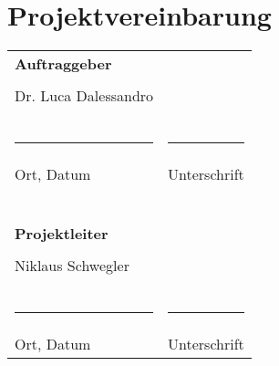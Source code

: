 \section{Projektvereinbarung}
\begin{tabular}{l l}
\textbf{Auftraggeber} &\\
&\\
Dr. Luca Dalessandro \\
&\\
&\\
&\\
\rule{6cm}{0.5pt} & \rule{6cm}{0.5pt}\\
Ort, Datum & Unterschrift\\
&\\
&\\
&\\
&\\
&\\
&\\
\textbf{Projektleiter} &\\
&\\
Niklaus Schwegler&\\
&\\
&\\
&\\
\rule{6cm}{0.5pt} & \rule{6cm}{0.5pt}\\
Ort, Datum & Unterschrift\\
\end{tabular}

